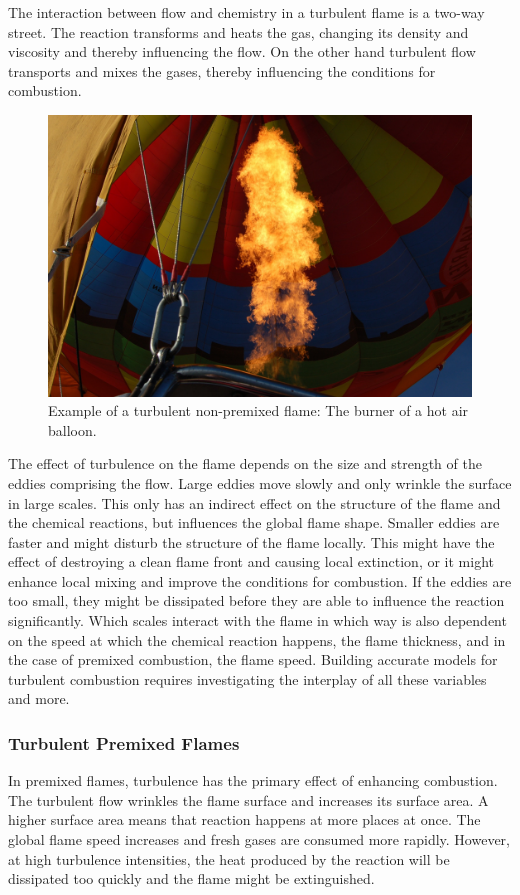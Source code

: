 %
The interaction between flow and chemistry in a turbulent flame is a two-way
street.
%
The reaction transforms and heats the gas, changing its density and viscosity
and thereby influencing the flow.
%
On the other hand turbulent flow transports and mixes the gases, thereby
influencing the conditions for combustion.
%
\begin{figure}[t]
    \centering
    \includegraphics[width=\textwidth]{figures/balloon_burner.jpg}
    \caption{Example of a turbulent non-premixed flame: The burner of a hot air
    balloon.}
    \label{fig:balloon_burner}
\end{figure}
%

%
The effect of turbulence on the flame depends on the size and strength of
the eddies comprising the flow.
%
Large eddies move slowly and only wrinkle the surface in large scales.
%
This only has an indirect effect on the structure of the flame and the chemical
reactions, but influences the global flame shape.
%
Smaller eddies are faster and might disturb the structure of the flame locally.
%
This might have the effect of destroying a clean flame front and causing local
extinction, or it might enhance local mixing and improve the conditions for
combustion.
%
If the eddies are too small, they might be dissipated before they are able to
influence the reaction significantly.
%
Which scales interact with the flame in which way is also dependent on the speed
at which the chemical reaction happens, the flame thickness, and in the case of
premixed combustion, the flame speed.
%
Building accurate models for turbulent combustion requires in\-ves\-ti\-ga\-ting
the interplay of all these variables and more.
%
\subsubsection{Turbulent Premixed Flames} %
\label{ssub:turbulent_premixed_flames}
%
In premixed flames, turbulence has the primary effect of enhancing combustion.
%
The turbulent flow wrinkles the flame surface and increases its surface area.
%
A higher surface area means that reaction happens at more places at once.
%
The global flame speed increases and fresh gases are consumed more rapidly.
%
However, at high turbulence intensities, the heat produced by the reaction
will be dissipated too quickly and the flame might be extinguished.
%

